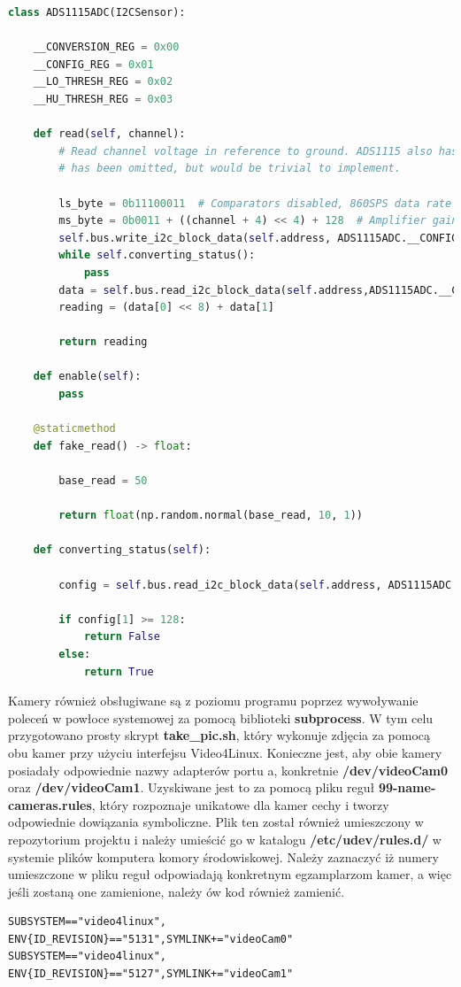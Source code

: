 \begin{lstlisting}[language=Python, caption={Przykładowa klasa czujnika.}]
class ADS1115ADC(I2CSensor):
	
	__CONVERSION_REG = 0x00
	__CONFIG_REG = 0x01
	__LO_THRESH_REG = 0x02
	__HU_THRESH_REG = 0x03
	
	def read(self, channel):
		# Read channel voltage in reference to ground. ADS1115 also has a differential measuring mode, which
		# has been omitted, but would be trivial to implement.
		
		ls_byte = 0b11100011  # Comparators disabled, 860SPS data rate
		ms_byte = 0b0011 + ((channel + 4) << 4) + 128  # Amplifier gain set to 1, start single conversion, pick channel.
		self.bus.write_i2c_block_data(self.address, ADS1115ADC.__CONFIG_REG, [ms_byte, ls_byte])
		while self.converting_status():
			pass
		data = self.bus.read_i2c_block_data(self.address,ADS1115ADC.__CONVERSION_REG,2)
		reading = (data[0] << 8) + data[1]
		
		return reading
	
	def enable(self):
		pass
	
	@staticmethod
	def fake_read() -> float:
	
		base_read = 50
		
		return float(np.random.normal(base_read, 10, 1))
	
	def converting_status(self):
	
		config = self.bus.read_i2c_block_data(self.address, ADS1115ADC.__CONFIG_REG, 2)
		
		if config[1] >= 128:
			return False
		else:
			return True
\end{lstlisting}

Kamery również obsługiwane są z poziomu programu poprzez wywoływanie poleceń w powłoce systemowej za pomocą biblioteki \textbf{subprocess}. W tym celu przygotowano prosty skrypt \textbf{take\_pic.sh}, który wykonuje zdjęcia za pomocą obu kamer przy użyciu interfejsu Video4Linux. Konieczne jest, aby obie kamery posiadały odpowiednie nazwy adapterów portu a, konkretnie \textbf{/dev/videoCam0} oraz \textbf{/dev/videoCam1}. Uzyskiwane jest to za pomocą pliku reguł \textbf{99-name-cameras.rules}, który rozpoznaje unikatowe dla kamer cechy i tworzy odpowiednie dowiązania symboliczne. Plik ten został również umieszczony w repozytorium projektu i należy umieścić go w katalogu \textbf{/etc/udev/rules.d/} w systemie plików komputera komory środowiskowej. Należy zaznaczyć iż numery umieszczone w pliku reguł odpowiadają konkretnym egzamplarzom kamer, a więc jeśli zostaną one zamienione, należy ów kod również zamienić.
\begin{lstlisting}[caption={Plik reguł \textbf{99-name-cameras.rules}.}]
SUBSYSTEM=="video4linux", ENV{ID_REVISION}=="5131",SYMLINK+="videoCam0"
SUBSYSTEM=="video4linux", ENV{ID_REVISION}=="5127",SYMLINK+="videoCam1"
\end{lstlisting}

